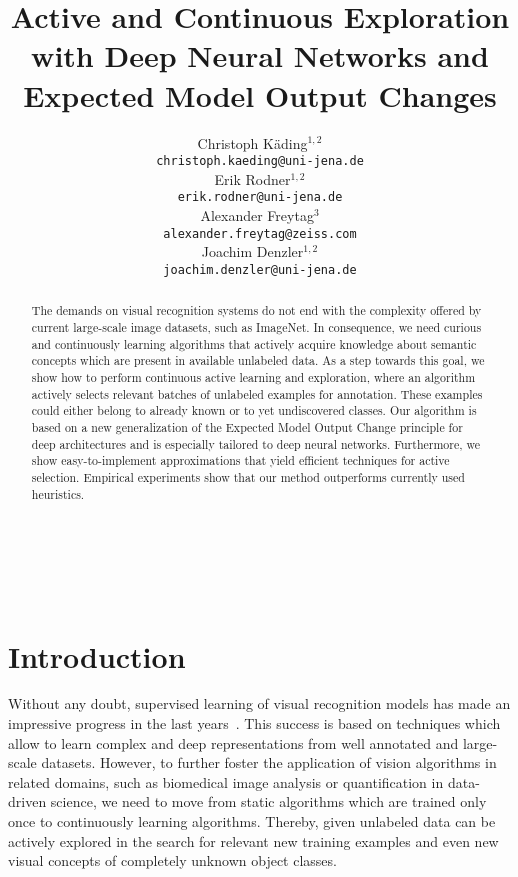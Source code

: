\documentclass{article}
\title{Active and Continuous Exploration with Deep Neural Networks and Expected Model Output Changes}
\author{
    Christoph K{\"a}ding$^{1,2}$\\
    \small\texttt{christoph.kaeding@uni-jena.de}\\
    \And
    Erik Rodner$^{1,2}$\\
    \small\texttt{erik.rodner@uni-jena.de}\\
    \And
    Alexander Freytag$^{3}$\\
    \small\texttt{alexander.freytag@zeiss.com}\\
    \And
    Joachim Denzler$^{1,2}$\\
    \small\texttt{joachim.denzler@uni-jena.de}\\
}
\begin{document}
\maketitle

\vspace{-1.5em}{
    \centering
    $^1$Computer Vision Group, Friedrich Schiller University Jena, Germany\\
    $^2$Michael Stifel Center Jena, Germany\\
    $^3$Carl Zeiss AG, Jena, Germany\\
}

\\\

\begin{abstract}
    The demands on visual recognition systems do not end with the complexity offered by current large-scale image datasets, such as ImageNet. %
    In consequence,
    we need curious and continuously learning algorithms that actively acquire knowledge about semantic concepts which are present in available unlabeled data.
    As a step towards this goal,
    we show how to perform continuous active learning and exploration,
    where an algorithm actively selects relevant batches of unlabeled examples for annotation.
    These examples could either belong to already known or to yet undiscovered classes.
    Our algorithm is based on a new generalization of the Expected Model Output Change principle for deep architectures and is especially tailored to deep neural networks.
    Furthermore,
    we show easy-to-implement approximations that yield efficient techniques for active selection.
    Empirical experiments show that our method outperforms currently used heuristics.
\end{abstract}

\section{Introduction}
Without any doubt,
supervised learning of visual recognition models has made an impressive progress in the last years~\cite{Agrawal14:APM,Babenko2014,Hariharan2014,Branson2014a,Girshick2014}.
This success is based on techniques which allow to learn complex and deep representations from well annotated and large-scale datasets.
However, to further foster the application of vision algorithms in related domains, such as biomedical image analysis or
quantification in data-driven science, we need to move from static algorithms which are trained only once to continuously learning algorithms.
Thereby,
given unlabeled data can be actively explored in the search
for relevant new training examples and even new visual concepts of completely unknown object classes.
\end{document}
